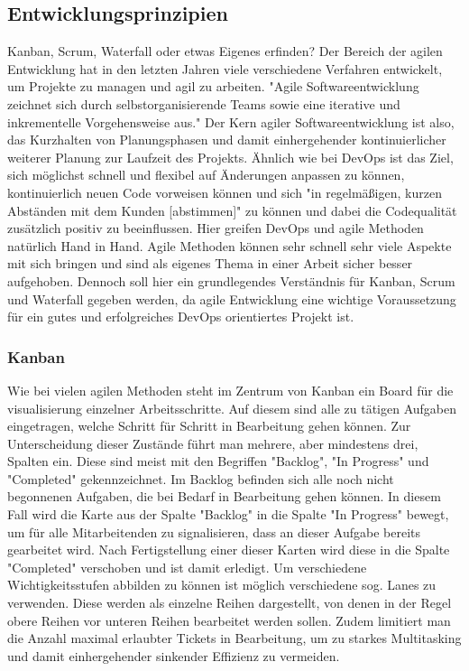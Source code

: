 \subsection{Entwicklungsprinzipien}

Kanban, Scrum, Waterfall oder etwas Eigenes erfinden?
Der Bereich der agilen Entwicklung hat in den letzten Jahren viele verschiedene Verfahren entwickelt, um Projekte zu managen und agil zu arbeiten.
"Agile Softwareentwicklung zeichnet sich durch selbstorganisierende Teams sowie eine iterative und inkrementelle Vorgehensweise aus."\cite{AgileSoftwareentwicklung2021}
Der Kern agiler Softwareentwicklung ist also, das Kurzhalten von Planungsphasen und damit einhergehender kontinuierlicher weiterer Planung zur Laufzeit des Projekts.
Ähnlich wie bei DevOps ist das Ziel, sich möglichst schnell und flexibel auf Änderungen anpassen zu können, kontinuierlich neuen Code vorweisen können und sich "in regelmäßigen, kurzen Abständen mit dem Kunden [abstimmen]"\cite{AgileSoftwareentwicklung2021} zu können und dabei die Codequalität zusätzlich positiv zu beeinflussen.
Hier greifen DevOps und agile Methoden natürlich Hand in Hand.
Agile Methoden können sehr schnell sehr viele Aspekte mit sich bringen und sind als eigenes Thema in einer Arbeit sicher besser aufgehoben.
Dennoch soll hier ein grundlegendes Verständnis für Kanban, Scrum und Waterfall gegeben werden, da agile Entwicklung eine wichtige Voraussetzung für ein gutes und erfolgreiches DevOps orientiertes Projekt ist.

\subsubsection{Kanban}\label{subsubsec:kanban}

Wie bei vielen agilen Methoden steht im Zentrum von Kanban ein Board für die visualisierung einzelner Arbeitsschritte.
Auf diesem sind alle zu tätigen Aufgaben eingetragen, welche Schritt für Schritt in Bearbeitung gehen können.
Zur Unterscheidung dieser Zustände führt man mehrere, aber mindestens drei, Spalten ein.
Diese sind meist mit den Begriffen "Backlog", "In Progress" und "Completed" gekennzeichnet.
Im Backlog befinden sich alle noch nicht begonnenen Aufgaben, die bei Bedarf in Bearbeitung gehen können.
In diesem Fall wird die Karte aus der Spalte "Backlog" in die Spalte "In Progress" bewegt, um für alle Mitarbeitenden zu signalisieren, dass an dieser Aufgabe bereits gearbeitet wird.
Nach Fertigstellung einer dieser Karten wird diese in die Spalte "Completed" verschoben und ist damit erledigt.
Um verschiedene Wichtigkeitsstufen abbilden zu können ist möglich verschiedene sog. Lanes zu verwenden.
Diese werden als einzelne Reihen dargestellt, von denen in der Regel obere Reihen vor unteren Reihen bearbeitet werden sollen.
Zudem limitiert man die Anzahl maximal erlaubter Tickets in Bearbeitung, um zu starkes Multitasking und damit einhergehender sinkender Effizienz zu vermeiden.

